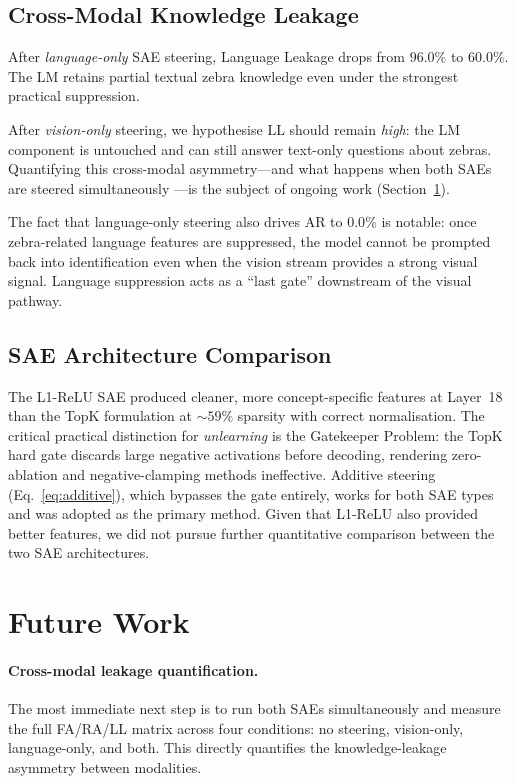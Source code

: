 \documentclass{article}
\begin{document}
\subsection{Cross-Modal Knowledge Leakage}

After \emph{language-only} SAE steering, Language Leakage drops from
$96.0\%$ to $60.0\%$. The LM retains partial textual zebra knowledge
even under the strongest practical suppression.

After \emph{vision-only} steering, we hypothesise LL should remain
\emph{high}: the LM component is untouched and can still answer
text-only questions about zebras. Quantifying this cross-modal
asymmetry---and what happens when both SAEs are steered simultaneously
---is the subject of ongoing work (Section~\ref{sec:future}).

The fact that language-only steering also drives AR to $0.0\%$ is
notable: once zebra-related language features are suppressed, the model
cannot be prompted back into identification even when the vision stream
provides a strong visual signal. Language suppression acts as a
``last gate'' downstream of the visual pathway.

\subsection{SAE Architecture Comparison}

The L1-ReLU SAE produced cleaner, more concept-specific features at
Layer~18 than the TopK formulation at $\sim\!59\%$ sparsity with correct
normalisation. The critical practical distinction for \emph{unlearning}
is the Gatekeeper Problem: the TopK hard gate discards large negative
activations before decoding, rendering zero-ablation and
negative-clamping methods ineffective. Additive steering
(Eq.~\ref{eq:additive}), which bypasses the gate entirely, works for
both SAE types and was adopted as the primary method. Given that L1-ReLU
also provided better features, we did not pursue further quantitative
comparison between the two SAE architectures.

\section{Future Work}
\label{sec:future}

\paragraph{Cross-modal leakage quantification.}
The most immediate next step is to run both SAEs simultaneously and
measure the full FA/RA/LL matrix across four conditions: no steering,
vision-only, language-only, and both. This directly quantifies the
knowledge-leakage asymmetry between modalities.
\end{document}
